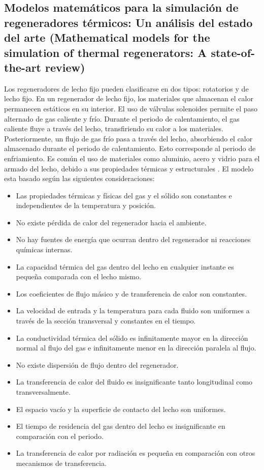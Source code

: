 \documentclass[12pt,letterpaper,final]{article}%
\begin{document}
\subsection*{Modelos matemáticos para la simulación de regeneradores térmicos: Un análisis del estado del arte (Mathematical models for the simulation of thermal regenerators:
	A state-of-the-art review)}
Los regeneradores de lecho fijo pueden clasificarse en dos tipos: rotatorios y de lecho fijo. En un regenerador de lecho fijo, los materiales que almacenan el calor permanecen estáticos en su interior. El uso de válvulas solenoides permite el paso alternado de gas caliente y frío. Durante el periodo de calentamiento, el gas caliente fluye a través del lecho, transfiriendo su calor a los materiales. Posteriormente, un flujo de gas frío pasa a través del lecho, absorbiendo el calor almacenado durante el periodo de calentamiento. Esto corresponde al periodo de enfriamiento.
Es común el uso de materiales como aluminio, acero y vidrio para el armado del lecho, debido a sus propiedades térmicas y estructurales \cite{SADRAMELI2016}.
\newline
El modelo esta basado según las siguientes consideraciones:
\begin{itemize}
	\item Las propiedades térmicas y físicas del gas y el sólido son constantes e independientes de la temperatura y posición. \item No existe pérdida de calor del regenerador hacia el ambiente. \item No hay fuentes de energía que ocurran dentro del regenerador ni reacciones químicas internas. \item La capacidad térmica del gas dentro del lecho en cualquier instante es pequeña comparada con el lecho mismo. \item Los coeficientes de flujo másico y de transferencia de calor son constantes. \item La velocidad de entrada y la temperatura para cada fluido son uniformes a través de la sección transversal y constantes en el tiempo. \item La conductividad térmica del sólido es infinitamente mayor en la dirección normal al flujo del gas e infinitamente menor en la dirección paralela al flujo. \item No existe dispersión de flujo dentro del regenerador. \item La transferencia de calor del fluido es insignificante tanto longitudinal como transversalmente. \item El espacio vacío y la superficie de contacto del lecho son uniformes. \item El tiempo de residencia del gas dentro del lecho es insignificante en comparación con el periodo. \item La transferencia de calor por radiación es pequeña en comparación con otros mecanismos de transferencia.
\end{itemize}
\end{document}
